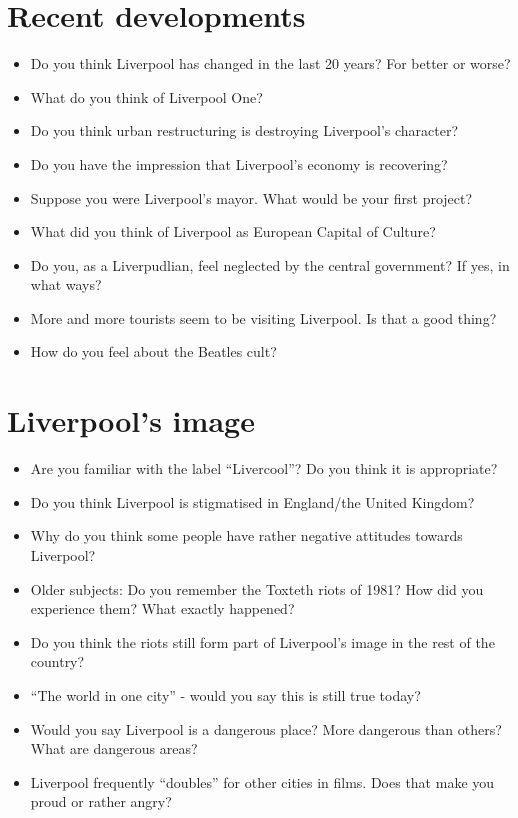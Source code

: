 	\section*{Recent developments}
	\begin{multicols}{2}
		\begin{itemize}
			\item Do you think Liverpool has changed in the last 20 years? For better or worse?
			\item What do you think of Liverpool One?
			\item Do you think urban restructuring is destroying Liverpool's character?
			\item Do you have the impression that Liverpool's economy is recovering?
			\item Suppose you were Liverpool's mayor. What would be your first project?
			\item What did you think of Liverpool as European Capital of Culture?
			\item Do you, as a Liverpudlian, feel neglected by the central government? If yes, in what ways?
			\item More and more tourists seem to be visiting Liverpool. Is that a good thing?
			\item How do you feel about the Beatles cult?
		\end{itemize}
	\end{multicols}
	
	\section*{Liverpool's image}
	\begin{multicols}{2}
		\begin{itemize}
			\item Are you familiar with the label “Livercool”? Do you think it is appropriate?
			\item Do you think Liverpool is stigmatised in England/the United Kingdom?
			\item Why do you think some people have rather negative attitudes towards Liverpool?
			\item Older subjects: Do you remember the Toxteth riots of 1981? How did you experience them? What exactly happened?
			\item Do you think the riots still form part of Liverpool's image in the rest of the country?
			\item ``The world in one city'' - would you say this is still true today?
			\item Would you say Liverpool is a dangerous place? More dangerous than others? What are dangerous areas?
			\item Liverpool frequently ``doubles'' for other cities in films. Does that make you proud or rather angry?
		\end{itemize}
	\end{multicols}
	
